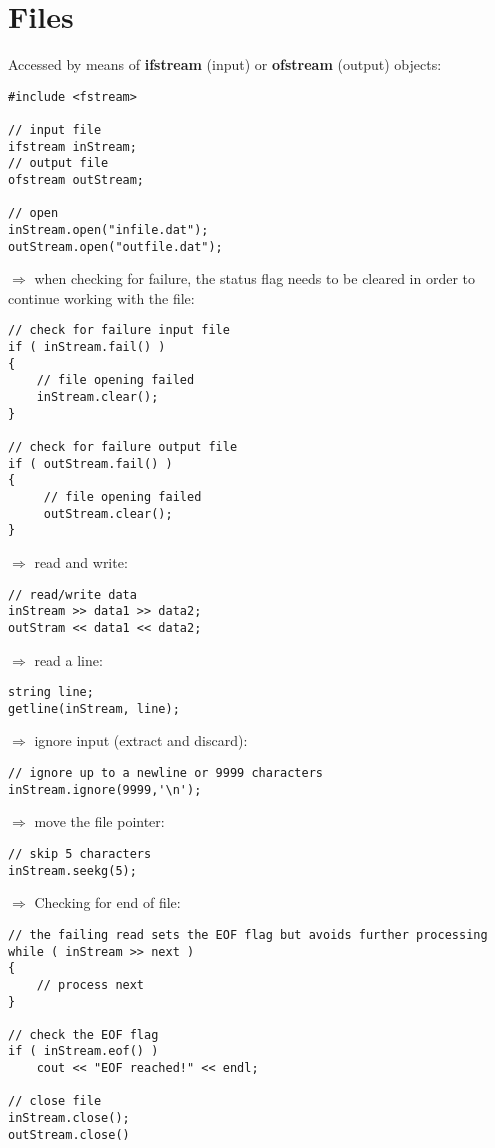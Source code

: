 \documentclass[10pt]{article}
\begin{document}
\section{Files}
\small
Accessed by means of \textbf{ifstream} (input) or
\textbf{ofstream} (output) objects:
\begin{lstlisting}
#include <fstream>

// input file
ifstream inStream;
// output file
ofstream outStream;

// open
inStream.open("infile.dat");
outStream.open("outfile.dat");
\end{lstlisting}
$\Rightarrow$ when checking for failure, the status flag needs to be cleared
in order to continue working with the file:
\begin{lstlisting}
// check for failure input file
if ( inStream.fail() )
{
    // file opening failed
    inStream.clear();
}

// check for failure output file
if ( outStream.fail() )
{
     // file opening failed
     outStream.clear();
}
\end{lstlisting}
$\Rightarrow$ read and write:
\begin{lstlisting}
// read/write data
inStream >> data1 >> data2;
outStram << data1 << data2;
\end{lstlisting}
$\Rightarrow$ read a line:
\begin{lstlisting}
string line;
getline(inStream, line);
\end{lstlisting}
$\Rightarrow$ ignore input (extract and discard):
\begin{lstlisting}
// ignore up to a newline or 9999 characters
inStream.ignore(9999,'\n');
\end{lstlisting}
$\Rightarrow$ move the file pointer:
\begin{lstlisting}
// skip 5 characters
inStream.seekg(5);
\end{lstlisting}
$\Rightarrow$ Checking for end of file:
\begin{lstlisting}
// the failing read sets the EOF flag but avoids further processing
while ( inStream >> next )
{
    // process next
}

// check the EOF flag
if ( inStream.eof() )
    cout << "EOF reached!" << endl;

// close file
inStream.close();
outStream.close()
\end{lstlisting}
%
%
\end{document}
